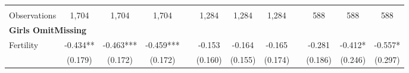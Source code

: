 \begin{landscape}
\begin{table}[htpb!]
\begin{center}
\begin{tabular}{lcccp{2mm}cccp{2mm}ccc}
\begin{footnotesize}\end{footnotesize}&\begin{footnotesize}\end{footnotesize}&\begin{footnotesize}\end{footnotesize}&\begin{footnotesize}\end{footnotesize}&\begin{footnotesize}\end{footnotesize}&\begin{footnotesize}\end{footnotesize}&\begin{footnotesize}\end{footnotesize}&\begin{footnotesize}\end{footnotesize}&\begin{footnotesize}\end{footnotesize}&\begin{footnotesize}\end{footnotesize}&\begin{footnotesize}\end{footnotesize}&\begin{footnotesize}\end{footnotesize}\\Observations&1,704&1,704&1,704&&1,284&1,284&1,284&&588&588&588\\
\multicolumn{12}{l}{\textbf{Girls OmitMissing}}\\ 
Fertility&-0.434**&-0.463***&-0.459***&&-0.153&-0.164&-0.165&&-0.281&-0.412*&-0.557*\\
&(0.179)&(0.172)&(0.172)&&(0.160)&(0.155)&(0.174)&&(0.186)&(0.246)&(0.297)\\

\end{tabular}
\end{center}
\end{table}
\end{landscape}
